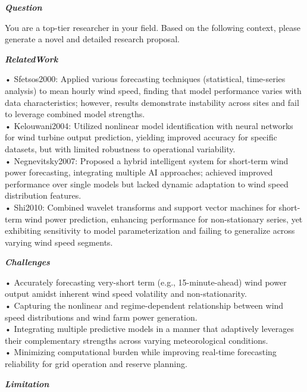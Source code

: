 \begin{tcolorbox}[
    breakable,
    title={Example of Idea Generation in Energy},
    colback=LighterGray,
    colframe=DeepPurple,
    colbacktitle=DeepPurple,
    coltitle=White,
]
\textbf{\emph{\textcolor{DeepPurple}{Question}}}

You are a top-tier researcher in your field. Based on the following context, please generate a novel and detailed research proposal.

\textbf{\emph{\textcolor{CaseOrange}{RelatedWork}}}

• Sfetsos2000: Applied various forecasting techniques (statistical, time-series analysis) to mean hourly wind speed, finding that model performance varies with data characteristics; however, results demonstrate instability across sites and fail to leverage combined model strengths. \\
• Kelouwani2004: Utilized nonlinear model identification with neural networks for wind turbine output prediction, yielding improved accuracy for specific datasets, but with limited robustness to operational variability. \\
• Negnevitsky2007: Proposed a hybrid intelligent system for short-term wind power forecasting, integrating multiple AI approaches; achieved improved performance over single models but lacked dynamic adaptation to wind speed distribution features. \\
• Shi2010: Combined wavelet transforms and support vector machines for short-term wind power prediction, enhancing performance for non-stationary series, yet exhibiting sensitivity to model parameterization and failing to generalize across varying wind speed segments. 

\textbf{\emph{\textcolor{CaseOrange}{Challenges}}}

• Accurately forecasting very-short term (e.g., 15-minute-ahead) wind power output amidst inherent wind speed volatility and non-stationarity. \\
• Capturing the nonlinear and regime-dependent relationship between wind speed distributions and wind farm power generation. \\
• Integrating multiple predictive models in a manner that adaptively leverages their complementary strengths across varying meteorological conditions. \\
• Minimizing computational burden while improving real-time forecasting reliability for grid operation and reserve planning. 

\textbf{\emph{\textcolor{CaseOrange}{Limitation}}}


\end{tcolorbox}
